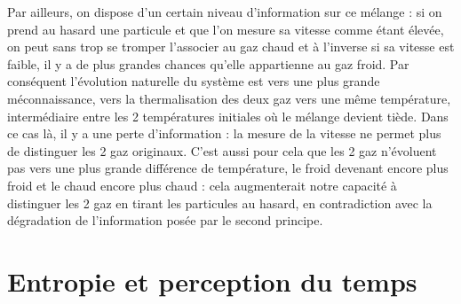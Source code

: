 Par ailleurs, on dispose d'un certain niveau d'information sur ce mélange : si on prend au hasard une particule et que l'on mesure sa vitesse comme étant élevée, on peut sans trop se tromper l'associer au gaz chaud et à l'inverse si sa vitesse est faible, il y a de plus grandes chances qu'elle appartienne au gaz froid. Par conséquent l'évolution naturelle du système est vers une plus grande méconnaissance, vers la thermalisation des deux gaz vers une même température, intermédiaire entre les 2 températures initiales où le mélange devient tiède. Dans ce cas là, il y a une perte d'information : la mesure de la vitesse ne permet plus de distinguer les 2 gaz originaux. C'est aussi pour cela que les 2 gaz n'évoluent pas vers une plus grande différence de température, le froid devenant encore plus froid et le chaud encore plus chaud : cela augmenterait notre capacité à distinguer les 2 gaz en tirant les particules au hasard, en contradiction avec la dégradation de l'information posée par le second principe.

\section{Entropie et perception du temps}

